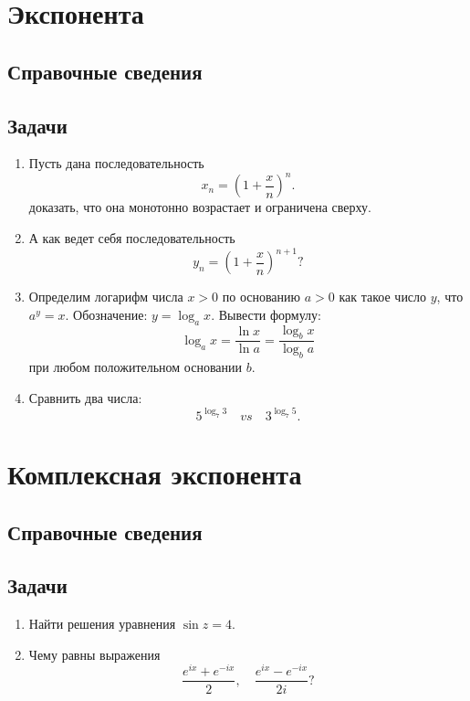\section{Экспонента}

\subsection*{Справочные сведения}

\subsection*{Задачи}

\begin{enumerate}
\item Пусть дана последовательность
$$
x_n = \left(1+\frac xn\right)^n.
$$
доказать, что она монотонно возрастает и ограничена сверху.
\item А как ведет себя последовательность
$$
y_n = \left(1+\frac xn\right)^{n+1}?
$$
\item Определим логарифм числа $x>0$ по основанию $a>0$ как такое число $y$, что $a^y=x$. Обозначение: $y=\log_a x$. Вывести формулу:
$$
\log_a x = \frac{\ln x}{\ln a} = \frac{\log_b x}{\log_b a}
$$
при любом положительном основании $b$.
\item Сравнить два числа:
$$
5^{\log_7 3}\quad vs\quad   3^{\log_7 5}.
$$

\end{enumerate}



\section{Комплексная экспонента}

\subsection*{Справочные сведения}

\subsection*{Задачи}
\begin{enumerate}
\item Найти решения уравнения $\sin z=4$.
\item Чему равны выражения
$$
\frac{e^{ix}+e^{-ix}}{2},\quad \frac{e^{ix}-e^{-ix}}{2i}?
$$
\end{enumerate}



